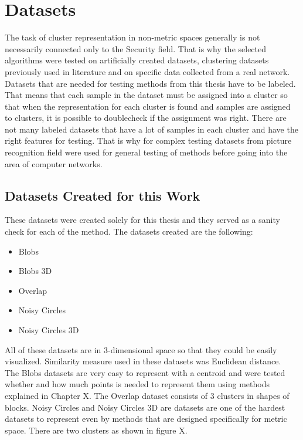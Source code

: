 \documentclass[thesis=B,english]{FITthesis}[2012/10/20]
\begin{document}
\section{Datasets}\label{sec:datasets}                                                           
The task of cluster representation in non-metric spaces generally is not necessarily connected only to the Security field.
That is why the selected algorithms were tested on artificially created datasets, clustering datasets previously used in literature and on specific data collected from a real network.
Datasets that are needed for testing methods from this thesis have to be labeled.
That means that each sample in the dataset must be assigned into a cluster so that when the representation for each cluster is found and samples are assigned to clusters, it is possible to doublecheck if the assignment was right.
There are not many labeled datasets that have a lot of samples in each cluster and have the right features for testing. 
That is why for complex testing datasets from picture recognition field were used for general testing of methods before going into the area of computer networks.

\subsection{Datasets Created for this Work}

These datasets were created solely for this thesis and they served as a sanity check for each of the method.
The datasets created are the following:
\begin{itemize}
    \item Blobs
    \item Blobs 3D
    \item Overlap
    \item Noisy Circles
    \item Noisy Circles 3D
\end{itemize}
All of these datasets are in 3-dimensional space so that they could be easily visualized. 
Similarity measure used in these datasets was Euclidean distance. \\

The Blobs datasets are very easy to represent with a centroid and were tested whether and how much points is needed to represent them using methods explained in Chapter X.  The Overlap dataset consists of 3 clusters in shapes of blocks. Noisy Circles and Noisy Circles 3D are datasets are one of the hardest datasets to represent even by methods that are designed specifically for metric space.
There are two clusters as shown in figure X. 
\end{document}
